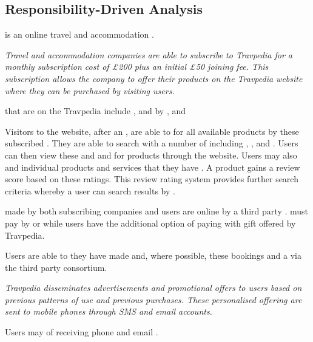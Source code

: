 \subsection{Responsibility-Driven Analysis }

 is an online travel and accommodation .

\emph{Travel and accommodation companies are able to subscribe to Travpedia for
a monthly subscription cost of £200 plus an initial £50 joining fee. This
subscription allows the company to offer their products on the Travpedia
website where they can be purchased by visiting users.}

 that are  on the Travpedia 
include ,  and  by
,  and 

Visitors to the website, after  an , are able
to  for all available products  by these
subscribed . They are able to search with a number of
 including , ,
 and . Users can then view these  and  and  for products through the website.
Users may also  and  individual products and services
that they have . A product gains a review score based on
these ratings. This review rating system provides further search criteria
whereby a user can  search results by .

 made by both subscribing companies and users are
 online by a third party .
 must pay by  or  while
users have the additional option of paying with gift  offered
by Travpedia.

Users are able to  they have made and, where
possible,  these bookings and  a 
via the third party consortium.

\emph{Travpedia disseminates advertisements and promotional offers to users
based on previous patterns of use and previous purchases.  These personalised
offering are sent to mobile phones through SMS and email accounts.}

Users may  of receiving phone and email .
